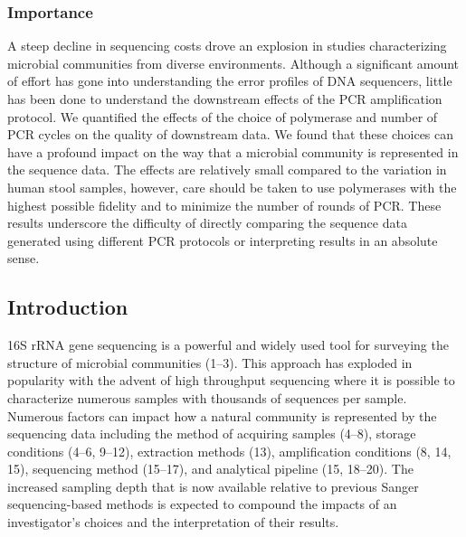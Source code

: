 \documentclass[11pt,]{article}
\begin{document}
\hypertarget{importance}{%
\subsubsection{Importance}\label{importance}}

A steep decline in sequencing costs drove an explosion in studies
characterizing microbial communities from diverse environments. Although
a significant amount of effort has gone into understanding the error
profiles of DNA sequencers, little has been done to understand the
downstream effects of the PCR amplification protocol. We quantified the
effects of the choice of polymerase and number of PCR cycles on the
quality of downstream data. We found that these choices can have a
profound impact on the way that a microbial community is represented in
the sequence data. The effects are relatively small compared to the
variation in human stool samples, however, care should be taken to use
polymerases with the highest possible fidelity and to minimize the
number of rounds of PCR. These results underscore the difficulty of
directly comparing the sequence data generated using different PCR
protocols or interpreting results in an absolute sense.

\newpage

\hypertarget{introduction}{%
\subsection{Introduction}\label{introduction}}

16S rRNA gene sequencing is a powerful and widely used tool for
surveying the structure of microbial communities (1--3). This approach
has exploded in popularity with the advent of high throughput sequencing
where it is possible to characterize numerous samples with thousands of
sequences per sample. Numerous factors can impact how a natural
community is represented by the sequencing data including the method of
acquiring samples (4--8), storage conditions (4--6, 9--12), extraction
methods (13), amplification conditions (8, 14, 15), sequencing method
(15--17), and analytical pipeline (15, 18--20). The increased sampling
depth that is now available relative to previous Sanger sequencing-based
methods is expected to compound the impacts of an investigator's choices
and the interpretation of their results.
\end{document}
